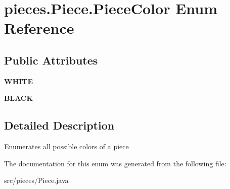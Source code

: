 \hypertarget{enumpieces_1_1_piece_1_1_piece_color}{}\section{pieces.\+Piece.\+Piece\+Color Enum Reference}
\label{enumpieces_1_1_piece_1_1_piece_color}
\subsection*{Public Attributes}
\begin{DoxyCompactItemize}
\item 
\mbox{\label{enumpieces_1_1_piece_1_1_piece_color_a936833f5f6ffb9d58752b1dbc9efcbde}} 
{\bfseries W\+H\+I\+TE}
\item 
\mbox{\label{enumpieces_1_1_piece_1_1_piece_color_ab720fe34a5ee1d4f2d64c8d32a276a09}} 
{\bfseries B\+L\+A\+CK}
\end{DoxyCompactItemize}


\subsection{Detailed Description}
Enumerates all possible colors of a piece 

The documentation for this enum was generated from the following file\+:\begin{DoxyCompactItemize}
\item 
src/pieces/Piece.\+java\end{DoxyCompactItemize}
